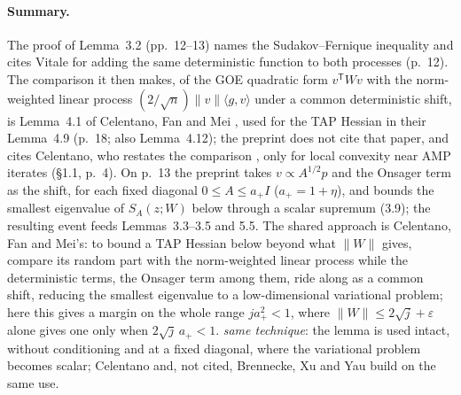 \documentclass[11pt]{article}
\newcommand{\norm}[1]{\lVert #1\rVert}
\newcommand{\ip}[2]{\langle #1,#2\rangle}
\newcommand{\ploc}[2]{#1}
\newcommand{\sloc}[2]{\cite[#2]{#1}}
\newcommand{\rel}[1]{\textit{#1}}
\begin{document}
\paragraph{Summary.}
The proof of \ploc{Lemma~3.2 (pp.~12--13)}{matrices.tex:145--236} names the
Sudakov--Fernique inequality and cites Vitale for adding the same
deterministic function to both processes \ploc{(p.~12)}{matrices.tex:169--173}.
The comparison it then makes, of the GOE quadratic form $v^{\mathsf T}Wv$
with the norm-weighted linear process $(2/\sqrt n)\norm v\ip gv$ under a
common deterministic shift, is Lemma~4.1 of Celentano, Fan and Mei
\sloc{CelentanoFanMei2021-LocalConvexityTAPZ2Sync}{Lemma~4.1, p.~15}, used
for the TAP Hessian in their Lemma~4.9 (p.~18; also Lemma~4.12); the
preprint does not cite that paper, and cites Celentano, who restates the
comparison \sloc{Celentano2022-SudakovFerniquePostAMPTAPConvexity}{Prop.~1, p.~6},
only for local convexity near AMP iterates
\ploc{(\S1.1, p.~4)}{introduction.tex:120--122}.
On \ploc{p.~13}{matrices.tex:179--221} the preprint takes $v\propto A^{1/2}p$
and the Onsager term as the shift, for each fixed diagonal $0\le A\le a_+I$
($a_+=1+\eta$), and bounds the smallest eigenvalue of $S_A(z;W)$ below through
a scalar supremum \ploc{(3.9)}{matrices.tex:197--217}; the resulting event
feeds \ploc{Lemmas~3.3--3.5}{matrices.tex:349--351, 716, 753--757} and
\ploc{5.5}{stability.tex:481--483, 638--639}.
The shared approach is Celentano, Fan and Mei's: to bound a TAP Hessian below
beyond what $\norm W$ gives, compare its random part with the norm-weighted
linear process while the deterministic terms, the Onsager term among them,
ride along as a common shift, reducing the smallest eigenvalue to a low-dimensional
variational problem; here this gives a margin on the whole range $ja_+^2<1$,
where $\norm W\le2\sqrt j+\varepsilon$ alone gives one only when
$2\sqrt j\,a_+<1$.
\rel{same technique}: the lemma is used intact, without conditioning and at a
fixed diagonal, where the variational problem becomes scalar; Celentano and,
not cited, Brennecke, Xu and Yau
\sloc{BrenneckeXuYau2023-OperatorNormCorrelationSK}{Prop.~4.5 and Step~1 of its proof, pp.~24--28}
build on the same use.
\end{document}
